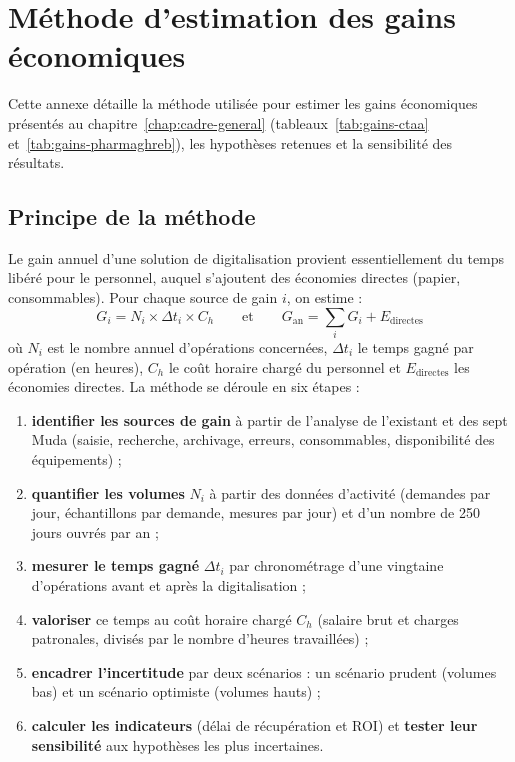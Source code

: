 \chapter{Méthode d'estimation des gains économiques}
\label{annexe:gains}

Cette annexe détaille la méthode utilisée pour estimer les gains économiques présentés au chapitre~\ref{chap:cadre-general} (tableaux~\ref{tab:gains-ctaa} et~\ref{tab:gains-pharmaghreb}), les hypothèses retenues et la sensibilité des résultats.


\section{Principe de la méthode}

Le gain annuel d'une solution de digitalisation provient essentiellement du temps libéré pour le personnel, auquel s'ajoutent des économies directes (papier, consommables). Pour chaque source de gain $i$, on estime :
\[
G_i = N_i \times \Delta t_i \times C_h
\qquad\text{et}\qquad
G_{\text{an}} = \sum_i G_i + E_{\text{directes}}
\]
où $N_i$ est le nombre annuel d'opérations concernées, $\Delta t_i$ le temps gagné par opération (en heures), $C_h$ le coût horaire chargé du personnel et $E_{\text{directes}}$ les économies directes. La méthode se déroule en six étapes :
\begin{enumerate}
    \item \textbf{identifier les sources de gain} à partir de l'analyse de l'existant et des sept Muda (saisie, recherche, archivage, erreurs, consommables, disponibilité des équipements) ;
    \item \textbf{quantifier les volumes} $N_i$ à partir des données d'activité (demandes par jour, échantillons par demande, mesures par jour) et d'un nombre de 250 jours ouvrés par an ;
    \item \textbf{mesurer le temps gagné} $\Delta t_i$ par chronométrage d'une vingtaine d'opérations avant et après la digitalisation ;
    \item \textbf{valoriser} ce temps au coût horaire chargé $C_h$ (salaire brut et charges patronales, divisés par le nombre d'heures travaillées) ;
    \item \textbf{encadrer l'incertitude} par deux scénarios : un scénario prudent (volumes bas) et un scénario optimiste (volumes hauts) ;
    \item \textbf{calculer les indicateurs} (délai de récupération et \ac{ROI}) et \textbf{tester leur sensibilité} aux hypothèses les plus incertaines.
\end{enumerate}


